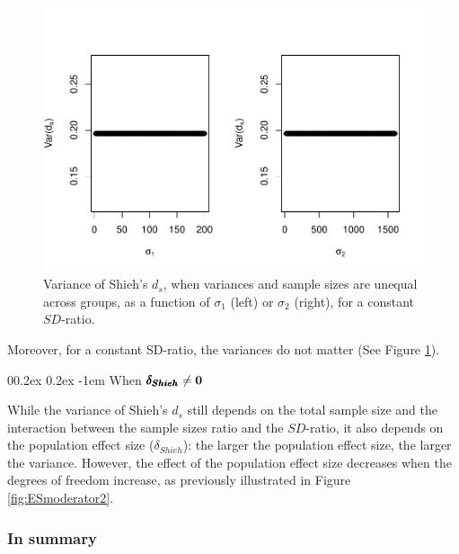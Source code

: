 \documentclass[
  english,
  man]{apa6}
\makeatletter
\let\oldparagraph\paragraph
\renewcommand{\paragraph}[1]{\oldparagraph{#1}\mbox{}}
\renewcommand{\paragraph}{\@startsection{paragraph}{4}{\parindent}%
  {0\baselineskip \@plus 0.2ex \@minus 0.2ex}%
  {-1em}%
  {\normalfont\normalsize\bfseries\itshape\typesectitle}}
\makeatother
\begin{document}
\begin{figure}
\centering
\includegraphics{Theoretical-Variance-of-all-estimators-as-a-function-of-population-parameters_files/figure-latex/varshiehhetunbalvariance2-1.pdf}
\caption{\label{fig:varshiehhetunbalvariance2}Variance of Shieh's \(d_s\), when variances and sample sizes are unequal across groups, as a function of \(\sigma_1\) (left) or \(\sigma_2\) (right), for a constant \(SD\)-ratio.}
\end{figure}

Moreover, for a constant SD-ratio, the variances do not matter (See Figure \ref{fig:varshiehhetunbalvariance2}).

\hypertarget{when-bf-pmbdelta_shieh-neq-0-2}{%
\paragraph{\texorpdfstring{When \(\bf \pmb{\delta_{Shieh}} \neq 0\)}{When \textbackslash bf \textbackslash pmb\{\textbackslash delta\_\{Shieh\}\} \textbackslash neq 0}}\label{when-bf-pmbdelta_shieh-neq-0-2}}

While the variance of Shieh's \(d_s\) still depends on the total sample size and the interaction between the sample sizes ratio and the \(SD\)-ratio, it also depends on the population effect size (\(\delta_{Shieh}\)): the larger the population effect size, the larger the variance. However, the effect of the population effect size decreases when the degrees of freedom increase, as previously illustrated in Figure \ref{fig:ESmoderator2}.

\hypertarget{in-summary-3}{%
\subsubsection{In summary}\label{in-summary-3}}
\end{document}
